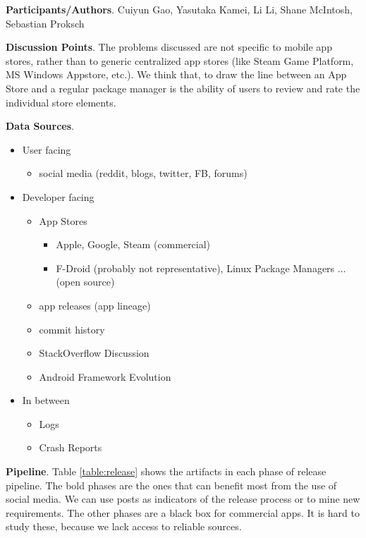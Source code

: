 \documentclass[a4paper]{article}
\newcommand{\smallsection}[1]{\noindent \textbf{#1}. }
\begin{document}
\smallsection{Participants/Authors}
Cuiyun Gao, Yasutaka Kamei, Li Li, Shane McIntosh, Sebastian Proksch

\smallsection{Discussion Points}
The problems discussed are not specific to mobile app stores, rather than to generic centralized app stores (like Steam Game Platform, MS Windows Appstore, etc.). We think that, to draw the line between an App Store and a regular package manager is the ability of users to review and rate the individual store elements.

\smallsection{Data Sources}
\begin{itemize}
    \tightlist
    \item User facing
        \begin{itemize}
            \tightlist
            \item social media (reddit, blogs, twitter, FB, forums)
        \end{itemize}
    \item Developer facing
        \begin{itemize}
            \tightlist
            \item App Stores
                \begin{itemize}
                    \tightlist
                    \item Apple, Google, Steam (commercial)
                    \item F-Droid (probably not representative), Linux Package Managers ... (open source)
                \end{itemize}
            \item app releases (app lineage)
            \item commit history
            \item StackOverflow Discussion
            \item Android Framework Evolution
        \end{itemize}
    \item In between
        \begin{itemize}
            \tightlist
            \item Logs
            \item Crash Reports
        \end{itemize}
\end{itemize}

\smallsection{Pipeline} Table \ref{table:release} shows the artifacts in each phase of release pipeline. The bold phases are the ones that can benefit most from the use of social media. We can use posts as indicators of the release process or to mine new requirements. The other phases are a black box for commercial apps. It is hard to study these, because we lack access to reliable sources.
\end{document}
